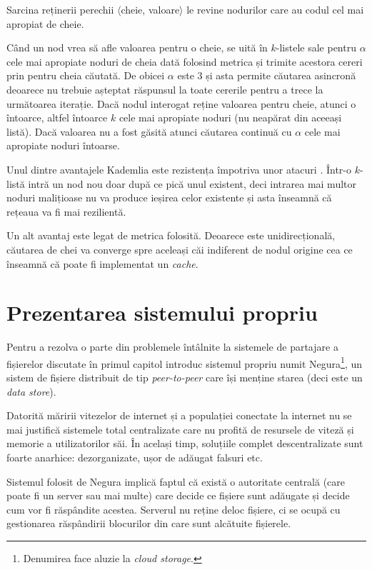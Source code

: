 \documentclass[a4wide,12pt]{report}
\newcommand{\eng}[1]{\emph{#1}} %
\newcommand{\uplu}[1]{$\langle$#1$\rangle$} %
\newcommand{\acr}[1]{{\textsmaller[1]{\textsc{#1}}}} %
\begin{document}
Sarcina reținerii perechii \uplu{cheie, valoare} le revine nodurilor care au codul cel mai apropiat de cheie.

Când un nod vrea să afle valoarea pentru o cheie, se uită în $k$-listele sale pentru $\alpha$ cele mai apropiate noduri
de cheia dată folosind metrica \acr{XOR} și trimite acestora cereri prin \acr{UDP} pentru cheia căutată. De obicei
$\alpha$ este 3 și asta permite căutarea asincronă deoarece nu trebuie așteptat răspunsul la toate cererile pentru a
trece la următoarea iterație. Dacă nodul interogat reține valoarea pentru cheie, atunci o întoarce, altfel întoarce $k$
cele mai apropiate noduri (nu neapărat din aceeași listă). Dacă valoarea nu a fost găsită atunci căutarea continuă cu
$\alpha$ cele mai apropiate noduri întoarse.

Unul dintre avantajele Kademlia este rezistența împotriva unor atacuri \acr{DoS}. Într-o $k$-listă intră un nod nou doar
după ce pică unul existent, deci intrarea mai multor noduri malițioase nu va produce ieșirea celor existente și asta
înseamnă că rețeaua va fi mai rezilientă.

Un alt avantaj este legat de metrica \acr{XOR} folosită. Deoarece este unidirecțională, căutarea de chei va converge
spre aceleași căi indiferent de nodul origine cea ce înseamnă că poate fi implementat un \eng{cache}.

\chapter{Prezentarea sistemului propriu}

Pentru a rezolva o parte din problemele întâlnite la sistemele de partajare a fișierelor discutate în primul capitol
introduc sistemul propriu numit Negura\footnote{Denumirea face aluzie la \eng{cloud storage}.}, un sistem de fișiere
distribuit de tip \eng{peer-to-peer} care își menține starea (deci este un \eng{data store}).

Datorită măririi vitezelor de internet și a populației conectate la internet nu se mai justifică sistemele total
centralizate care nu profită de resursele de viteză și memorie a utilizatorilor săi. În același timp, soluțiile complet
descentralizate sunt foarte anarhice: dezorganizate, ușor de adăugat falsuri etc.

Sistemul folosit de Negura implică faptul că există o autoritate centrală (care poate fi un server sau mai multe)
care decide ce fișiere sunt adăugate și decide cum vor fi răspândite acestea. Serverul nu reține deloc fișiere, ci se
ocupă cu gestionarea răspândirii blocurilor din care sunt alcătuite fișierele.
\end{document}
